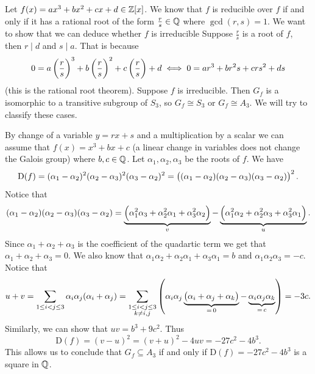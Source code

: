 \documentclass[11pt,a4paper]{article}
\renewcommand{\Dif}{\mathrm{D}}
\begin{document}
\begin{example}
  \label{exmp:polynomials-of-degree-three}
  Let $f(x) = ax^3 + bx^2 + cx + d \in \mathbb{Z}[x]$.
  We know that $f$ is reducible over $f$ if and only if it has a rational
  root of the form $\frac{r}{s} \in \mathbb{Q}$ where $\gcd(r,s) = 1$.
  We want to show that we can deduce whether $f$ is irreducible
  Suppose $\frac{r}{s}$ is a root of $f$,
  then $r \mid d$ and $s \mid a$.
  That is because
  \begin{gather*}
    0 = a\del{\frac{r}{s}}^3 + b\del{\frac{r}{s}}^2 + c\del{\frac{r}{s}} + d
    \iff
    0 = ar^3 + br^2s + crs^2 + ds
  \end{gather*}
  (this is the rational root theorem).
  Suppose $f$ is irreducible.
  Then $G_f$ is a isomorphic to a transitive subgroup of $S_3$,
  so $G_f \cong S_3$ or $G_f \cong A_3$.
  We will try to classify these cases.

  By change of a variable $y = rx + s$ and a multiplication by a scalar
  we can assume that $f(x) = x^3 + bx + c$ (a linear change in variables
  does not change the Galois group)
  where $b,c \in \mathbb{Q}$.
  Let $\alpha_1,\alpha_2,\alpha_3$ be the roots of $f$.
  We have
  \[
    \Dif(f) =
    (\alpha_1 - \alpha_2)^2 (\alpha_2 - \alpha_3)^2 (\alpha_3 - \alpha_2)^2 =
    \del{(\alpha_1 - \alpha_2) (\alpha_2 - \alpha_3) (\alpha_3 - \alpha_2)}^2.
  \]
  Notice that
  \[
    (\alpha_1 - \alpha_2) (\alpha_2 - \alpha_3) (\alpha_3 - \alpha_2) =
    \underbrace{\del{\alpha_1^2 \alpha_3 + \alpha_2^2 \alpha_1 + \alpha_3^2 \alpha_2}}_{v} -
    \underbrace{\del{\alpha_1^2 \alpha_2 + \alpha_2^2 \alpha_3 + \alpha_3^2 \alpha_1}}_{u}.
  \]
  Since $\alpha_1 + \alpha_2 + \alpha_3$ is the coefficient of the quadartic
  term we get that $\alpha_1 + \alpha_2 + \alpha_3 = 0$.
  We also know that
    $\alpha_1 \alpha_2 + \alpha_2 \alpha_1 + \alpha_3 \alpha_1 = b$
    and
    $\alpha_1 \alpha_2 \alpha_3 = -c$.
  Notice that
  \[
    u + v =
    \sum_{1 \le i < j \le 3} \alpha_i \alpha_j (\alpha_i + \alpha_j) =
    \sum_{\substack{1 \le i < j \le 3 \\ k \neq i,j}}
    \del{\alpha_i \alpha_j \underbrace{\del{\alpha_i + \alpha_j + \alpha_k}}_{=\,0} - \underbrace{\alpha_i \alpha_j \alpha_k}_{=\,c}} = -3c.
  \]
  Similarly, we can show that $uv = b^3 + 9c^2$.
  Thus
  \[
    \Dif(f) = (v - u)^2 = (v + u)^2 - 4 u v = -27c^2 - 4b^3.
  \]
  This allows us to conclude that
  $G_f \subseteq A_3$ if and only if $\Dif(f) = -27c^2 - 4b^3$
  is a square in $\mathbb{Q}$.
\end{example}
\end{document}
